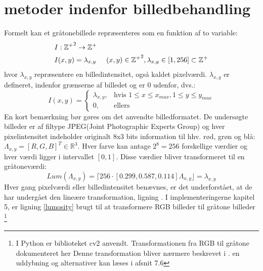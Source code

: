 \section{metoder indenfor billedbehandling}\label{subsec:kant}
Formelt kan et gråtonebillede repræsenteres som en funktion af to variable:
\begin{equation}
\begin{split}
&I: \mathbb{\mathbb{Z^+}}^2 \rightarrow \mathbb{Z}^+ \\
&I(x,y) = \lambda_{x,y} \hspace{0.5 cm} (x,y)\in \mathbb{Z^+}^2, \lambda_{x,y} \in [1,256] \subset \mathbb{Z^+}
\end{split}
\label{bf}
\end{equation}
hvor $\lambda_{x,y}$ repræsentere en billedintensitet, også kaldet pixelværdi. $\lambda_{x,y}$ er defineret, indenfor grænserne af billedet og er 0 udenfor, dvs.: 
\begin{equation}
 I(x, y) =
\begin{cases}
    \lambda_{x,y}, & \text{hvis } 1 \leq x \leq x_{max}, 1 \leq y \leq y_{max} \\
    0,              & \text{ellers}
    \label{pixelintensitet}
\end{cases}
\end{equation}
En kort bemærkning bør gøres om det anvendte billedformatet. De undersøgte billeder er af filtype JPEG(Joint Photographic Experts Group) og hver pixelintensitet indeholder originalt 8x3 bits information til hhv. rød, grøn og blå: $\Lambda_{x,y} = [R,G,B]^T \in \mathbb{R}^3$. Hver farve kan antage $2^8 = 256$ forskellige værdier og hver værdi ligger i intervallet $[0,1]$. Disse værdier bliver transformeret til en gråtoneværdi:
\begin{equation}
Lum(\Lambda_{x,y}) = \lceil	 256 \cdot [0.299, 0.587, 0.114] \Lambda_{x,y} \rfloor	 = \lambda_{x,y}
\label{lumosity}
\end{equation}  
Hver gang pixelværdi eller billedintensitet benævnes, er det underforstået, at de har undergået den lineære transformation, ligning \cite{lumosity}. I implementeringerne kapitel 5, er ligning \eqref{lumosity} brugt til at transformere RGB billeder til gråtone billeder \footnote{I Python er biblioteket cv2 anvendt. Transformationen fra RGB til gråtone dokumenteret her %
Denne transformation bliver nærmere beskrevet i \cite{lumosity}. en uddybning og alternativer kan læses i afsnit 7.6} 
\\

